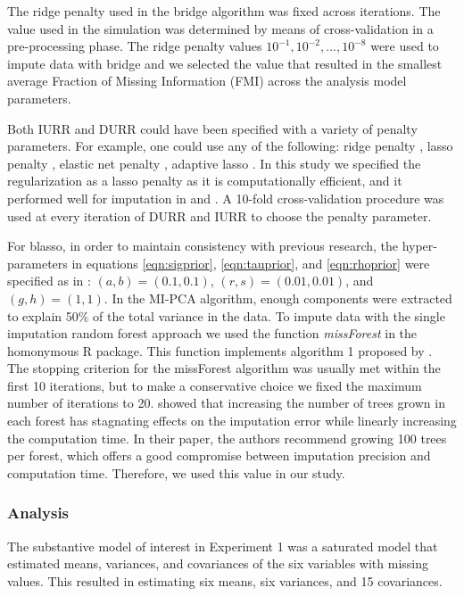	The ridge penalty used in the bridge algorithm was fixed across iterations.
	The value used in the simulation was determined by means of cross-validation in a pre-processing phase.
	The ridge penalty values $10^{-1}, 10^{-2}, ..., 10^{-8}$ were used to impute data with bridge
	and we selected the value that resulted in the smallest average Fraction of Missing Information (FMI) across 
	the analysis model parameters.
		
	Both IURR and DURR could have been specified with a variety of penalty parameters.
	For example, one could use any of the following: ridge penalty \citep{hoerlKennard:1970}, lasso penalty 
	\citep{tibshirani:1996}, elastic net penalty \citep{zouHastie:2005}, adaptive lasso \citep{zou:2006}.
	In this study we specified the regularization as a lasso penalty as it is computationally efficient, and it 
	performed well for imputation in \cite{zhaoLong:2016} and \cite{dengEtAl:2016}.
	A 10-fold cross-validation procedure was used at every iteration of DURR and IURR to choose the penalty parameter.

	For blasso, in order to maintain consistency with previous research, the hyper-parameters in equations 
	\eqref{eqn:sigprior}, \eqref{eqn:tauprior}, and \eqref{eqn:rhoprior} were specified as in \cite{zhaoLong:2016}: 
	$(a,b)=(0.1, 0.1)$, $(r,s)=(0.01, 0.01)$, and $(g,h)=(1,1)$.
	In the MI-PCA algorithm, enough components were extracted to explain 50\% of the total variance in the data.
	To impute data with the single imputation random forest approach we used the function \emph{missForest} in the 
	homonymous R package.
	This function implements algorithm 1 proposed by \cite{stekhovenBuhlmann:2011}.
	The stopping criterion for the missForest algorithm was usually met within the first 10 iterations, 
	but to make a conservative choice we fixed the maximum number of iterations to 20.
	\cite{stekhovenBuhlmann:2011} showed that increasing the number of trees grown in each forest has 
	stagnating effects on the imputation error while linearly increasing the computation time.
	In their paper, the authors recommend growing 100 trees per forest, which offers a good compromise 
	between imputation precision and computation time.
	Therefore, we used this value in our study.

\subsubsection{Analysis}
	The substantive model of interest in Experiment 1 was a saturated model that estimated means,
	variances, and covariances of the six variables with missing values.
	This resulted in estimating six means, six variances, and 15 covariances.

